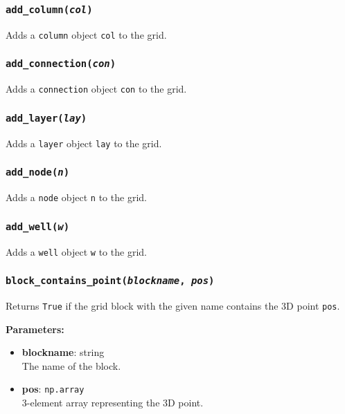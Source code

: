 \subsubsection{\texttt{add\_column(\emph{col})}}

Adds a \texttt{column} object \texttt{col} to the grid.

\subsubsection{\texttt{add\_connection(\emph{con})}}

Adds a \texttt{connection} object \texttt{con} to the grid.

\subsubsection{\texttt{add\_layer(\emph{lay})}}

Adds a \texttt{layer} object \texttt{lay} to the grid.

\subsubsection{\texttt{add\_node(\emph{n})}}

Adds a \texttt{node} object \texttt{n} to the grid.

\subsubsection{\texttt{add\_well(\emph{w})}}

Adds a \texttt{well} object \texttt{w} to the grid.

\subsubsection{\texttt{block\_contains\_point(\emph{blockname}, \emph{pos})}}

Returns \texttt{True} if the grid block with the given name contains the 3D point \texttt{pos}.

\textbf{Parameters:}
\begin{itemize}
\item \textbf{blockname}: string\\
  The name of the block.
\item \textbf{pos}: \texttt{np.array}\\
  3-element array representing the 3D point.
\end{itemize}

